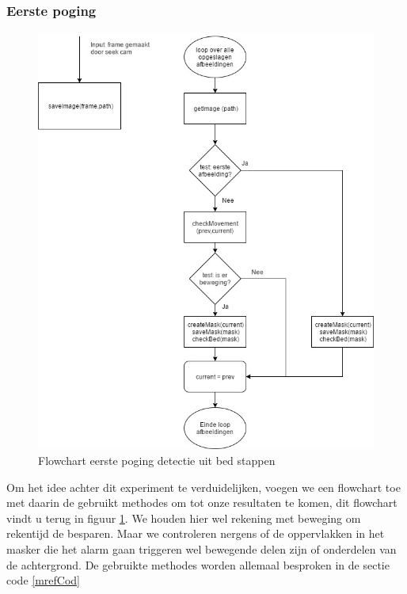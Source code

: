 \subsubsection{Eerste poging}
\label{ERefDUBEP}
\begin{figure}[hbp]
	\includegraphics[scale=0.45]{FlowChart_DetectUitBed_EerstePoging}
	\caption{Flowchart eerste poging detectie uit bed stappen}
	\label{imgFCDUBEP}
\end{figure}
Om het idee achter dit experiment te verduidelijken, voegen we een flowchart toe met daarin de gebruikt methodes om tot onze resultaten te komen, dit flowchart vindt u terug in figuur \ref{imgFCDUBEP}. We houden hier wel rekening met beweging om rekentijd de besparen. Maar we controleren nergens of de oppervlakken in het masker die het alarm gaan triggeren wel bewegende delen zijn of onderdelen van de achtergrond. De gebruikte methodes worden allemaal besproken in de sectie code \ref{mrefCod}

